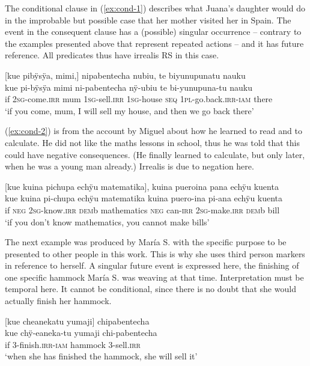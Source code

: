 The conditional clause in (\ref{ex:cond-1}) describes what Juana’s daughter would do in the improbable but possible case that her mother visited her in Spain. The event in the consequent clause has a (possible) singular occurrence – contrary to the examples presented above that represent repeated actions – and it has future reference. All predicates thus have irrealis RS in this case.

\ea\label{ex:cond-1}
\begingl
\glpreamble \textup{[}kue pibÿsÿa, mimi,\textup{]} nipabentecha nubiu, te biyunupunatu nauku\\
\gla kue pi-bÿsÿa mimi ni-pabentecha nÿ-ubiu te bi-yunupuna-tu nauku\\
\glb if 2\textsc{sg}-come.\textsc{irr} mum 1\textsc{sg}-sell.\textsc{irr} 1\textsc{sg}-house \textsc{seq} 1\textsc{pl}-go.back.\textsc{irr}-\textsc{iam} there\\
\glft ‘if you come, mum, I will sell my house, and then we go back there’
\endgl
\trailingcitation{[jxx-p110923l-1.432]}
\xe

(\ref{ex:cond-2}) is from the account by Miguel about how he learned to read and to calculate. He did not like the maths lessons in school, thus he was told that this could have negative consequences. (He finally learned to calculate, but only later, when he was a young man already.) Irrealis is due to negation here.

\ea\label{ex:cond-2}
\begingl
\glpreamble \textup{[}kue kuina pichupa echÿu matematika\textup{]}, kuina pueroina pana echÿu kuenta\\
\gla kue kuina pi-chupa echÿu matematika kuina puero-ina pi-ana echÿu kuenta\\
\glb if \textsc{neg} 2\textsc{sg}-know.\textsc{irr} \textsc{dem}b mathematics \textsc{neg} can-\textsc{irr} 2\textsc{sg}-make.\textsc{irr} \textsc{dem}b bill\\
\glft ‘if you don’t know mathematics, you cannot make bills’
\endgl
\trailingcitation{[mxx-p181027l-1.106]}
\xe

The next example was produced by María S. with the specific purpose to be presented to other people in this work. This is why she uses third person markers in reference to herself.  A singular future event is expressed here, the finishing of one specific hammock María S. was weaving at that time. Interpretation must be temporal here. It cannot be conditional, since there is no doubt that she would actually finish her hammock.

\ea\label{ex:irr-kue-1}
\begingl
\glpreamble \textup{[}kue cheanekatu yumaji\textup{]} chipabentecha\\
\gla kue chÿ-eaneka-tu yumaji chi-pabentecha\\
\glb if 3-finish.\textsc{irr}-\textsc{iam} hammock 3-sell.\textsc{irr}\\
\glft ‘when she has finished the hammock, she will sell it’
\endgl
\trailingcitation{[rxx-e181022le]}
\xe

